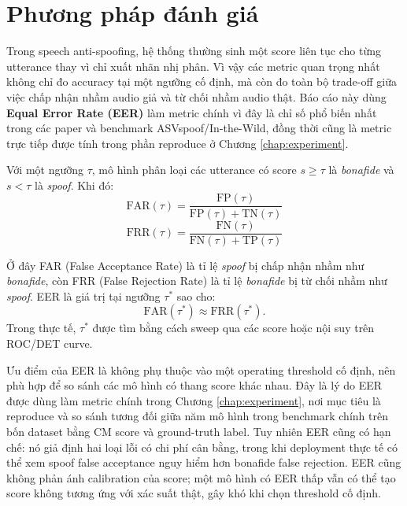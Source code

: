 \section{Phương pháp đánh giá}

Trong speech anti-spoofing, hệ thống thường sinh một score liên tục cho từng utterance thay vì chỉ xuất nhãn nhị phân. Vì vậy các metric quan trọng nhất không chỉ đo accuracy tại một ngưỡng cố định, mà còn đo toàn bộ trade-off giữa việc chấp nhận nhầm audio giả và từ chối nhầm audio thật. Báo cáo này dùng \textbf{Equal Error Rate (EER)} làm metric chính vì đây là chỉ số phổ biến nhất trong các paper và benchmark ASVspoof/In-the-Wild, đồng thời cũng là metric trực tiếp được tính trong phần reproduce ở Chương \ref{chap:experiment}.

Với một ngưỡng $\tau$, mô hình phân loại các utterance có score $s \geq \tau$ là \textit{bonafide} và $s < \tau$ là \textit{spoof}. Khi đó:
\begin{equation}
    \mathrm{FAR}(\tau) = \frac{\mathrm{FP}(\tau)}{\mathrm{FP}(\tau) + \mathrm{TN}(\tau)}
\end{equation}
\begin{equation}
    \mathrm{FRR}(\tau) = \frac{\mathrm{FN}(\tau)}{\mathrm{FN}(\tau) + \mathrm{TP}(\tau)}
\end{equation}

Ở đây FAR (False Acceptance Rate) là tỉ lệ \textit{spoof} bị chấp nhận nhầm như \textit{bonafide}, còn FRR (False Rejection Rate) là tỉ lệ \textit{bonafide} bị từ chối nhầm như \textit{spoof}. EER là giá trị tại ngưỡng $\tau^*$ sao cho:
\begin{equation}
    \mathrm{FAR}(\tau^*) \approx \mathrm{FRR}(\tau^*).
\end{equation}
Trong thực tế, $\tau^*$ được tìm bằng cách sweep qua các score hoặc nội suy trên ROC/DET curve.

Ưu điểm của EER là không phụ thuộc vào một operating threshold cố định, nên phù hợp để so sánh các mô hình có thang score khác nhau. Đây là lý do EER được dùng làm metric chính trong Chương \ref{chap:experiment}, nơi mục tiêu là reproduce và so sánh tương đối giữa năm mô hình trong benchmark chính trên bốn dataset bằng CM score và ground-truth label. Tuy nhiên EER cũng có hạn chế: nó giả định hai loại lỗi có chi phí cân bằng, trong khi deployment thực tế có thể xem spoof false acceptance nguy hiểm hơn bonafide false rejection. EER cũng không phản ánh calibration của score; một mô hình có EER thấp vẫn có thể tạo score không tương ứng với xác suất thật, gây khó khi chọn threshold cố định.

